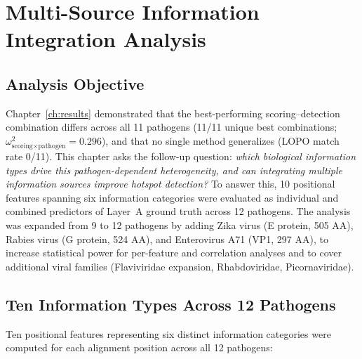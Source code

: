 \chapter{Multi-Source Information Integration Analysis}
\label{ch:adapt_orphan}

\section{Analysis Objective}
\label{sec:adapt_motivation}

Chapter~\ref{ch:results} demonstrated that the best-performing scoring--detection combination differs across all 11 pathogens (11/11 unique best combinations; $\omega^2_{\text{scoring}\times\text{pathogen}} = 0.296$), and that no single method generalizes (LOPO match rate 0/11).
This chapter asks the follow-up question: \textit{which biological information types drive this pathogen-dependent heterogeneity, and can integrating multiple information sources improve hotspot detection?}
To answer this, 10 positional features spanning six information categories were evaluated as individual and combined predictors of Layer~A ground truth across 12 pathogens.
The analysis was expanded from 9 to 12 pathogens by adding Zika virus (E protein, 505 AA), Rabies virus (G protein, 524 AA), and Enterovirus A71 (VP1, 297 AA), to increase statistical power for per-feature and correlation analyses and to cover additional viral families (Flaviviridae expansion, Rhabdoviridae, Picornaviridae).

\section{Ten Information Types Across 12 Pathogens}
\label{sec:10features}

Ten positional features representing six distinct information categories were computed for each alignment position across all 12 pathogens:

